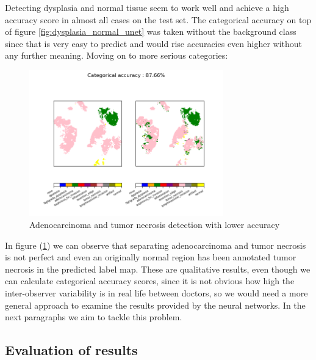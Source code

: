 \documentclass[a4paper,12pt]{article}
\begin{document}
\vspace{4mm}

\par Detecting dysplasia and normal tissue seem to work well and achieve a high accuracy score in almost all cases on the test set. The categorical accuracy on top of figure \ref{fig:dysplasia_normal_unet} was taken without the background class since that is very easy to predict and would rise accuracies even higher without any further meaning. Moving on to more serious categories:

\vspace{4mm}

\begin{figure}[H]
    \centering
    \includegraphics[width=0.75\textwidth]{results/046_19_8538.png}
    \caption{Adenocarcinoma and tumor necrosis detection with lower accuracy}
    \label{fig:adeno_tumor_unet}
\end{figure}

\vspace{4mm}

\par In figure (\ref{fig:adeno_tumor_unet}) we can observe that separating adenocarcinoma and tumor necrosis is not perfect and even an originally normal region has been annotated tumor necrosis in the predicted label map. These are qualitative results, even though we can calculate categorical accuracy scores, since it is not obvious how high the inter-observer variability is in real life between doctors, so we would need a more general approach to examine the results provided by the neural networks. In the next paragraphs we aim to tackle this problem.

\vspace{7mm}

\subsection{Evaluation of results}
\end{document}

